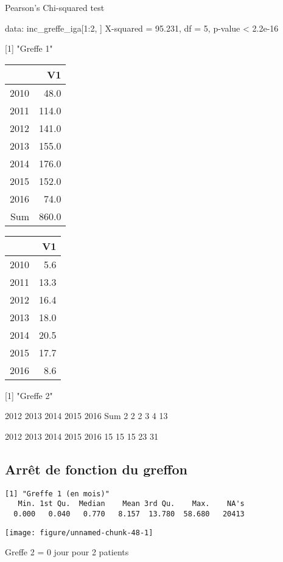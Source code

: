 \documentclass[11pt,a4paper]{article}\usepackage[]{graphicx}\usepackage[]{color}
\makeatletter
\def\maxwidth{ %
  \ifdim\Gin@nat@width>\linewidth
    \linewidth
  \else
    \Gin@nat@width
  \fi
}
\newenvironment{kframe}{%
 \def\at@end@of@kframe{}%
 \ifinner\ifhmode%
  \def\at@end@of@kframe{\end{minipage}}%
  \begin{minipage}{\columnwidth}%
 \fi\fi%
 \def\FrameCommand##1{\hskip\@totalleftmargin \hskip-\fboxsep
 \colorbox{shadecolor}{##1}\hskip-\fboxsep
     \hskip-\linewidth \hskip-\@totalleftmargin \hskip\columnwidth}%
 \MakeFramed {\advance\hsize-\width
   \@totalleftmargin\z@ \linewidth\hsize
   \@setminipage}}%
 {\par\unskip\endMakeFramed%
 \at@end@of@kframe}
\newenvironment{knitrout}{}{} %
\makeatother
\begin{document}
	Pearson's Chi-squared test

data:  inc_greffe_iga[1:2, ]
X-squared = 95.231, df = 5, p-value < 2.2e-16



[1] "Greffe 1"
\begin{table}[H]
\centering
\begin{tabular}{rr}
  \hline
 & V1 \\ 
  \hline
2010 & 48.0 \\ 
  2011 & 114.0 \\ 
  2012 & 141.0 \\ 
  2013 & 155.0 \\ 
  2014 & 176.0 \\ 
  2015 & 152.0 \\ 
  2016 & 74.0 \\ 
  Sum & 860.0 \\ 
   \hline
\end{tabular}
\end{table}
\begin{table}[H]
\centering
\begin{tabular}{rr}
  \hline
 & V1 \\ 
  \hline
2010 & 5.6 \\ 
  2011 & 13.3 \\ 
  2012 & 16.4 \\ 
  2013 & 18.0 \\ 
  2014 & 20.5 \\ 
  2015 & 17.7 \\ 
  2016 & 8.6 \\ 
   \hline
\end{tabular}
\end{table}
[1] "Greffe 2"

2012 2013 2014 2015 2016  Sum 
   2    2    2    3    4   13 

2012 2013 2014 2015 2016 
  15   15   15   23   31 



  \subsection{Arrêt de fonction du greffon}
  
\begin{knitrout}
\color{fgcolor}\begin{kframe}
\begin{verbatim}
[1] "Greffe 1 (en mois)"
   Min. 1st Qu.  Median    Mean 3rd Qu.    Max.    NA's 
  0.000   0.040   0.770   8.157  13.780  58.680   20413 
\end{verbatim}
\end{kframe}
\texttt{[image: figure/unnamed-chunk-48-1]} 

\end{knitrout}
Greffe 2 = 0 jour pour 2 patients
~\\
\end{document}

